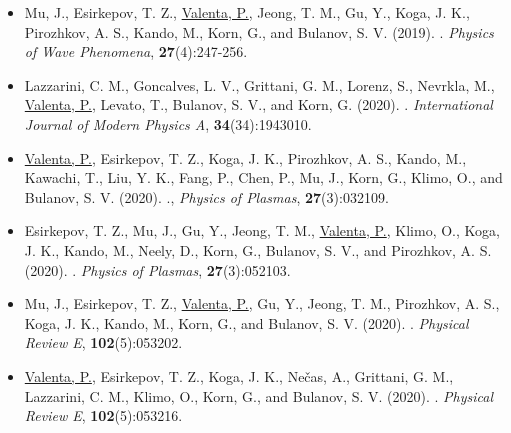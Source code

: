 \documentclass[10pt, a4paper, twoside, openright]{report}
\newcommand{\link}[3][blue]{\href{#2}{\color{#1}{#3}}}%
\begin{document}
\begin{itemize}
	
	\renewcommand{\labelitemi}{\tiny$\blacksquare$}
	
	\item Mu, J., Esirkepov, T. Z., \underline{Valenta, P.}, Jeong, T. M., Gu, Y., Koga, J. K., Pirozhkov, A. S., Kando, M., Korn, G., and Bulanov, S. V. (2019). \link{https://doi.org/10.3103/S1541308X19040010}{High-order harmonics from laser irradiated electron density singularity formed at the bow wave in the laser plasma}. \textit{Physics of Wave Phenomena}, \textbf{27}(4):247-256.
	
	\item Lazzarini, C. M., Goncalves, L. V., Grittani, G. M., Lorenz, S., Nevrkla, M., \underline{Valenta, P.}, Levato, T., Bulanov, S. V., and Korn, G. (2020). \link{https://doi.org/10.1142/S0217751X19430103}{Electron acceleration at ELI Beamlines: towards high-energy and high-repetition-rate accelerators}. \textit{International Journal of Modern Physics A}, \textbf{34}(34):1943010.
	
	\item \underline{Valenta, P.}, Esirkepov, T. Z., Koga, J. K., Pirozhkov, A. S., Kando, M., Kawachi, T., Liu, Y. K., Fang, P., Chen, P., Mu, J., Korn, G., Klimo, O., and Bulanov, S. V. (2020). \link{https://doi.org/10.1063/1.5142084}{Recoil effects on reflection from relativistic mirrors in laser plasmas}., \textit{Physics of Plasmas}, \textbf{27}(3):032109.
	
	\item Esirkepov, T. Z., Mu, J., Gu, Y., Jeong, T. M., \underline{Valenta, P.}, Klimo, O., Koga, J. K., Kando, M., Neely, D., Korn, G., Bulanov, S. V., and Pirozhkov, A. S. (2020). \link{https://doi.org/10.1063/5.0004525}{Optical probing of relativistic plasma singularities}. \textit{Physics of Plasmas}, \textbf{27}(3):052103.
	
	\item Mu, J., Esirkepov, T. Z., \underline{Valenta, P.}, Gu, Y., Jeong, T. M., Pirozhkov, A. S., Koga, J. K., Kando, M., Korn, G., and Bulanov, S. V. (2020). \link{https://doi.org/10.1103/PhysRevE.102.053202}{Relativistic flying forcibly oscillating reflective diffraction grating}. \textit{Physical Review E}, \textbf{102}(5):053202.
	
	\item \underline{Valenta, P.}, Esirkepov, T. Z., Koga, J. K., Nečas, A., Grittani, G. M., Lazzarini, C. M., Klimo, O., Korn, G., and Bulanov, S. V. (2020). \link{https://doi.org/10.1103/PhysRevE.102.053216}{Polarity reversal of wakefields driven by ultrashort pulse laser}. \textit{Physical Review E}, \textbf{102}(5):053216.
	

\end{itemize}
\end{document}
